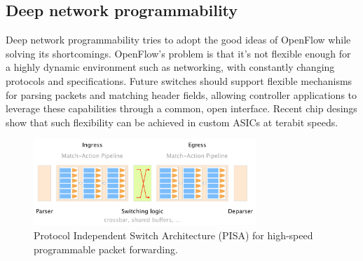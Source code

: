 \documentclass[11pt,oneside,a4paper]{article}
\begin{document}
\subsection{Deep network programmability}

Deep network programmability tries to adopt the good ideas of OpenFlow while solving its shortcomings. OpenFlow's problem is that it's  not flexible enough for a highly dynamic environment such as networking, with constantly changing protocols and specifications.
Future switches should support flexible mechanisms for parsing packets and matching header fields, allowing controller applications to leverage these capabilities through a common, open interface. Recent chip desings show that such flexibility can be achieved in custom ASICs at terabit speeds.

\begin{figure}[hb]
	\centering
	\includegraphics[width=0.75\textwidth,scale=1]{figures/PISA}
	\caption{Protocol Independent Switch Architecture (PISA) for high-speed programmable packet forwarding. \cite{advnet}}
	\label{fig:PISA}
\end{figure}

\newpage
\end{document}

